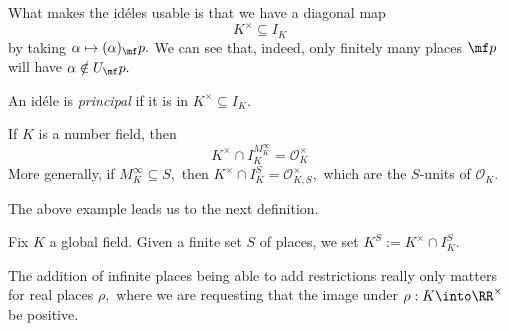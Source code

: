 What makes the id\'eles usable is that we have a diagonal map
\[K^\times\subseteq I_K\]
by taking $\alpha\mapsto(\alpha)_\mf p.$ We can see that, indeed, only finitely many places $\mf p$ will have $\alpha\notin U_\mf p.$
\begin{definition}
	An id\'ele is \textit{principal} if it is in $K^\times\subseteq I_K.$
\end{definition}
\begin{example}
	If $K$ is a number field, then
	\[K^\times\cap I_K^{M_K^\infty}=\mathcal O_K^\times\]
	More generally, if $M_K^\infty\subseteq S,$ then $K^\times\cap I_K^S=\mathcal O^\times_{K,S},$ which are the $S$-units of $\mathcal O_K.$
\end{example}
The above example leads us to the next definition.
\begin{definition}
	Fix $K$ a global field. Given a finite set $S$ of places, we set $K^S:=K^\times\cap I_K^S.$
\end{definition}
The addition of infinite places being able to add restrictions really only matters for real places $\rho,$ where we are requesting that the image under $\rho:K\into\RR^\times$ be positive.